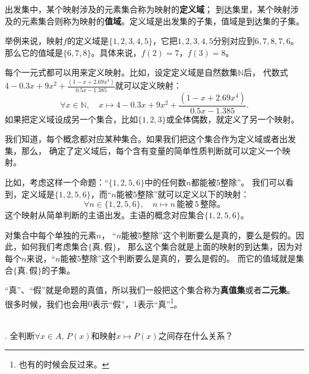 \documentclass[12pt,UTF8,fontset=none]{ctexbook}
\begin{document}
出发集中，某个映射涉及的元素集合称为映射的\textbf{定义域}；
到达集里，某个映射涉及的元素集合则称为映射的\textbf{值域}。定义域是出发集的子集，值域是到达集的子集。

举例来说，映射$f$的定义域是$\{1,2,3,4,5\}$，它把$1,2,3,4,5$分别对应到$6,7,8,7,6$。
那么它的值域是$\{6,7,8\}$。具体来说，$f(2) = 7$，$f(3) = 8$。





每个一元式都可以用来定义映射。比如，设定定义域是自然数集$\mathbb{N}$后，
代数式$4-0.3x+9x^2+\frac{(1-x+2.69x^4)}{0.5x-1.385}$就可以定义映射：
$$ \forall x\in\mathbb{N}, \quad x \mapsto 4-0.3x+9x^2+\frac{(1-x+2.69x^4)}{0.5x-1.385}. $$
如果把定义域设成另一个集合，比如$\{1,2,3\}$或全体偶数，就定义了另一个映射。

我们知道，每个概念都对应某种集合。如果我们把这个集合作为定义域或者出发集，那么，
确定了定义域后，每个含有变量的简单性质判断就可以定义一个映射。

比如，考虑这样一个命题：“$\{1,2,5,6\}$中的任何数$n$都能被$5$整除”。
我们可以看到，定义域是$\{1,2,5,6\}$，而“$n$能被$5$整除”就可以定义以下的映射：
$$ \forall n\in \{1,2,5,6\} , \quad n \mapsto n\,\mbox{能被}\,5\,\mbox{整除。} $$
这个映射从简单判断的主语出发。主语的概念对应集合$\{1,2,5,6\}$。

对集合中每个单独的元素$n$，
“$n$能被$5$整除”这个判断要么是真的，要么是假的。因此，如何我们考虑集合$\{\mbox{真}, \mbox{假}\}$，
那么这个集合就是上面的映射的到达集，因为对每个$n$来说，“$n$能被$5$整除”这个判断要么是真的，要么是假的。
而它的值域就是集合$\{\mbox{真}, \mbox{假}\}$的子集。

“真”、“假”就是命题的真值，所以我们一般把这个集合称为\textbf{真值集}或者\textbf{二元集}。
很多时候，我们也会用$0$表示“假”，$1$表示“真”\footnote{也有的时候会反过来。}。

\begin{sk}\label{sk:2-2-0}
    \mbox{} \\
    . 全判断$\forall x \in A, \, P(x)$和映射$x \mapsto P(x)$之间存在什么关系？\\
\end{sk}
\end{document}
